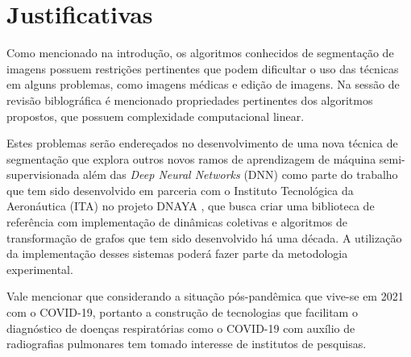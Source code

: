 \chapter{Justificativas}\label{cap:justificativas}

Como mencionado na introdução, os algoritmos conhecidos de segmentação
de imagens possuem restrições pertinentes que podem dificultar o uso
das técnicas em alguns problemas, como imagens médicas e edição de
imagens. Na sessão de revisão biblográfica é mencionado propriedades
pertinentes dos algoritmos propostos, que possuem complexidade
computacional linear.

Estes problemas serão endereçados no desenvolvimento de uma nova
técnica de segmentação que explora outros novos ramos de aprendizagem
de máquina semi-supervisionada além das \textit{Deep Neural Networks}
(DNN) como parte do trabalho que tem sido desenvolvido em parceria com
o Instituto Tecnológica da Aeronáutica (ITA) no projeto DNAYA
, que busca criar uma biblioteca de referência
com implementação de dinâmicas coletivas e algoritmos de transformação
de grafos que tem sido desenvolvido há uma década. A utilização da
implementação desses sistemas poderá fazer parte da metodologia experimental.

Vale mencionar que considerando a situação pós-pandêmica que vive-se
em 2021 com o COVID-19, portanto a construção de tecnologias que
facilitam o diagnóstico de doenças respiratórias como o COVID-19 com
auxílio de radiografias pulmonares tem tomado interesse de institutos
de pesquisas.
